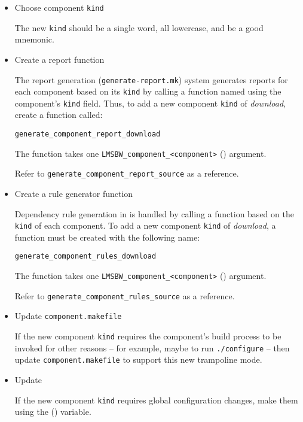 \begin{itemize}
\item Choose component \texttt{kind}

  The new \texttt{kind} should be a single word, all lowercase, and be
  a good mnemonic.

\item Create a report function

  The report generation (\texttt{generate-report.mk}) system generates
  reports for each component based on its \texttt{kind} by calling a
  function named using the component's \texttt{kind} field.  Thus, to
  add a new component \texttt{kind} of \emph{download}, create a
  function called:

\begin{verbatim}
generate_component_report_download
\end{verbatim}

  The function takes one \texttt{LMSBW\_component\_<component>}
  () argument.

  Refer to \texttt{generate\_component\_report\_source} as a
  reference.

\item Create a rule generator function

  Dependency rule generation in \lmsbw is handled by calling a
  function based on the \texttt{kind} of each component.  To add a new
  component \texttt{kind} of \emph{download}, a function must be
  created with the following name:

\begin{verbatim}
generate_component_rules_download
\end{verbatim}

  The function takes one \texttt{LMSBW\_component\_<component>}
  () argument.

  Refer to \texttt{generate\_component\_rules\_source} as a reference.

\item Update \texttt{component.makefile}

  If the new component \texttt{kind} requires the component's build
  process to be invoked for other reasons -- for example, maybe to run
  \texttt{./configure} -- then update \texttt{component.makefile} to
  support this new trampoline mode.

\item Update \lmsbwconfiguration

  If the new component \texttt{kind} requires global configuration
  changes, make them using the \lmsbwconfiguration
  () variable.


\end{itemize}
